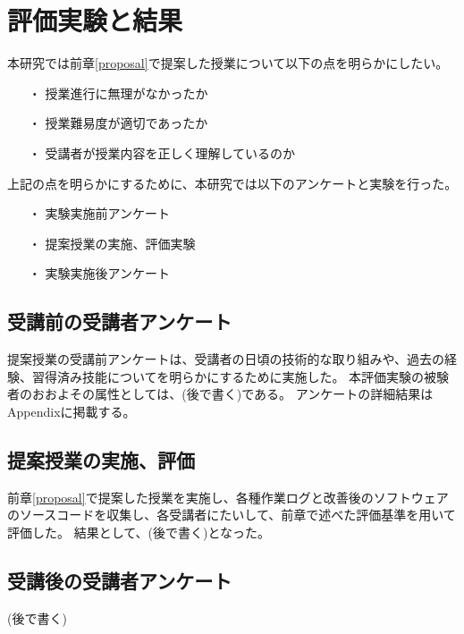 \chapter{評価実験と結果}

本研究では前章\ref{proposal}で提案した授業について以下の点を明らかにしたい。

\begin{itemize}
  \item[・] 授業進行に無理がなかったか
  \item[・] 授業難易度が適切であったか
  \item[・] 受講者が授業内容を正しく理解しているのか
\end{itemize}

上記の点を明らかにするために、本研究では以下のアンケートと実験を行った。

\begin{itemize}
  \item[・] 実験実施前アンケート
  \item[・] 提案授業の実施、評価実験
  \item[・] 実験実施後アンケート
\end{itemize}

\section{受講前の受講者アンケート}

提案授業の受講前アンケートは、受講者の日頃の技術的な取り組みや、過去の経験、習得済み技能についてを明らかにするために実施した。
本評価実験の被験者のおおよその属性としては、(後で書く)である。
アンケートの詳細結果はAppendixに掲載する。

\section{提案授業の実施、評価}

前章\ref{proposal}で提案した授業を実施し、各種作業ログと改善後のソフトウェアのソースコードを収集し、各受講者にたいして、前章で述べた評価基準を用いて評価した。
結果として、(後で書く)となった。

\section{受講後の受講者アンケート}

(後で書く)
